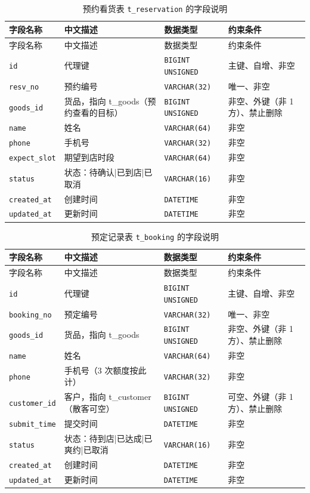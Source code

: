 \documentclass[12pt, a4paper]{ctexart}
\newcommand{\code}[1]{\texttt{\small #1}}
\begin{document}
\begin{longtable}{@{}p{3.1cm} p{4.5cm} p{2.4cm} p{4.5cm}@{}}
\caption{预约看货表 \code{t\_reservation} 的字段说明}\label{tab:f-t-reservation}\\
\toprule
字段名称 & 中文描述 & 数据类型 & 约束条件 \\
\midrule
\endfirsthead
\toprule
字段名称 & 中文描述 & 数据类型 & 约束条件 \\
\midrule
\endhead
\bottomrule
\endlastfoot
\code{id} & 代理键 & \code{BIGINT UNSIGNED} & 主键、自增、非空 \\
\code{resv\_no} & 预约编号 & \code{VARCHAR(32)} & 唯一、非空 \\
\code{goods\_id} & 货品，指向 t\_goods（预约查看的目标） & \code{BIGINT UNSIGNED} & 非空、外键（非 1 方）、禁止删除 \\
\code{name} & 姓名 & \code{VARCHAR(64)} & 非空 \\
\code{phone} & 手机号 & \code{VARCHAR(32)} & 非空 \\
\code{expect\_slot} & 期望到店时段 & \code{VARCHAR(64)} & 非空 \\
\code{status} & 状态：待确认|已到店|已取消 & \code{VARCHAR(16)} & 非空 \\
\code{created\_at} & 创建时间 & \code{DATETIME} & 非空 \\
\code{updated\_at} & 更新时间 & \code{DATETIME} & 非空 \\
\end{longtable}

\begin{longtable}{@{}p{3.1cm} p{4.5cm} p{2.4cm} p{4.5cm}@{}}
\caption{预定记录表 \code{t\_booking} 的字段说明}\label{tab:f-t-booking}\\
\toprule
字段名称 & 中文描述 & 数据类型 & 约束条件 \\
\midrule
\endfirsthead
\toprule
字段名称 & 中文描述 & 数据类型 & 约束条件 \\
\midrule
\endhead
\bottomrule
\endlastfoot
\code{id} & 代理键 & \code{BIGINT UNSIGNED} & 主键、自增、非空 \\
\code{booking\_no} & 预定编号 & \code{VARCHAR(32)} & 唯一、非空 \\
\code{goods\_id} & 货品，指向 t\_goods & \code{BIGINT UNSIGNED} & 非空、外键（非 1 方）、禁止删除 \\
\code{name} & 姓名 & \code{VARCHAR(64)} & 非空 \\
\code{phone} & 手机号（3 次额度按此计） & \code{VARCHAR(32)} & 非空 \\
\code{customer\_id} & 客户，指向 t\_customer（散客可空） & \code{BIGINT UNSIGNED} & 可空、外键（非 1 方）、禁止删除 \\
\code{submit\_time} & 提交时间 & \code{DATETIME} & 非空 \\
\code{status} & 状态：待到店|已达成|已爽约|已取消 & \code{VARCHAR(16)} & 非空 \\
\code{created\_at} & 创建时间 & \code{DATETIME} & 非空 \\
\code{updated\_at} & 更新时间 & \code{DATETIME} & 非空 \\
\end{longtable}
\end{document}
